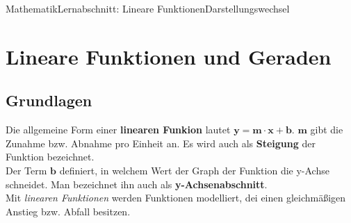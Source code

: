\documentclass[11pt,twocolumn,oneside,openany,headings=optiontotoc,11pt,numbers=noenddot]{article}
\begin{document}
	\begin{worksheet}{Mathematik}{Lernabschnitt: Lineare Funktionen}{Darstellungswechsel}
		\section{Lineare Funktionen und Geraden}
		\label{sec:lfug}
		\subsection{Grundlagen}
		Die allgemeine Form einer \textbf{linearen Funkion} lautet \(\mathbf{y = m\cdot{}x + b}\). \(\mathbf{m}\) gibt die Zunahme bzw. Abnahme pro Einheit an. Es wird auch als \textbf{Steigung} der Funktion bezeichnet.\\
		Der Term \(\mathbf{b}\) definiert, in welchem Wert der Graph der Funktion die y-Achse schneidet. Man bezeichnet ihn auch als \textbf{y-Achsenabschnitt}.\\
		Mit \textit{linearen Funktionen} werden Funktionen modelliert, dei einen gleichmäßigen Anstieg bzw. Abfall besitzen.

\end{worksheet}
\end{document}
